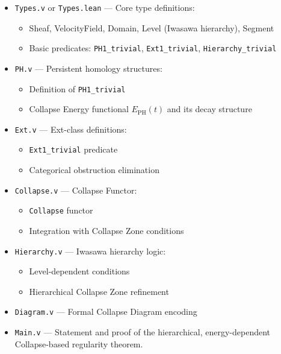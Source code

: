 \documentclass[11pt]{article}
\begin{document}
\begin{itemize}
  \item \texttt{Types.v} or \texttt{Types.lean} — Core type definitions:
  \begin{itemize}
    \item Sheaf, VelocityField, Domain, Level (Iwasawa hierarchy), Segment
    \item Basic predicates: \texttt{PH1\_trivial}, \texttt{Ext1\_trivial}, \texttt{Hierarchy\_trivial}
  \end{itemize}
  
  \item \texttt{PH.v} — Persistent homology structures:
  \begin{itemize}
    \item Definition of \texttt{PH1\_trivial}
    \item Collapse Energy functional \( E_{\mathrm{PH}}(t) \) and its decay structure
  \end{itemize}
  
  \item \texttt{Ext.v} — Ext-class definitions:
  \begin{itemize}
    \item \texttt{Ext1\_trivial} predicate
    \item Categorical obstruction elimination
  \end{itemize}
  
  \item \texttt{Collapse.v} — Collapse Functor:
  \begin{itemize}
    \item \texttt{Collapse} functor
    \item Integration with Collapse Zone conditions
  \end{itemize}
  
  \item \texttt{Hierarchy.v} — Iwasawa hierarchy logic:
  \begin{itemize}
    \item Level-dependent conditions
    \item Hierarchical Collapse Zone refinement
  \end{itemize}
  
  \item \texttt{Diagram.v} — Formal Collapse Diagram encoding
  
  \item \texttt{Main.v} — Statement and proof of the hierarchical, energy-dependent Collapse-based regularity theorem.

\end{itemize}
\end{document}
